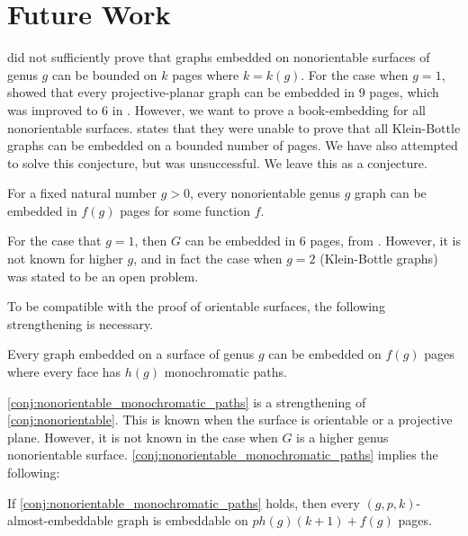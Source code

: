 
\section{Future Work}

\textcite{heathEmbeddingPlanarGraphs1984} did not sufficiently prove that graphs embedded on nonorientable surfaces of genus $g$ can be bounded on $k$ pages where $k = k(g)$. For the case when $g = 1$, \textcite{nakamotoBookEmbeddingProjectiveplanar2015} showed that every projective-planar graph can be embedded in $9$ pages, which was improved to 6 in \textcite{ozekiBookEmbeddingGraphs2019}. However, we want to prove a book-embedding for all nonorientable surfaces. 
\textcite{ozekiBookEmbeddingGraphs2019} states that they were unable to prove that all Klein-Bottle graphs can be embedded on a bounded number of pages. We have also attempted to solve this conjecture, but was unsuccessful. We leave this as a conjecture. 

\begin{conjecture}\label{conj:nonorientable}
	For a fixed natural number $g > 0$, every nonorientable genus $g$ graph can be embedded in $f(g)$ pages for some function $f$. 
\end{conjecture}

For the case that $g = 1$, then $G$ can be embedded in 6 pages, from \textcite{ozekiBookEmbeddingGraphs2019}. However, it is not known for higher $g$, and in fact the case when $g = 2$ (Klein-Bottle graphs) was stated to be an open problem. 

To be compatible with the proof of orientable surfaces, the following strengthening is necessary. 
\begin{conjecture}\label{conj:nonorientable_monochromatic_paths}
	Every graph embedded on a surface of genus $g$ can be embedded on $f(g)$ pages where every face has $h(g)$ monochromatic paths. 
\end{conjecture}

\cref{conj:nonorientable_monochromatic_paths} is a strengthening of \cref{conj:nonorientable}. This is known when the surface is orientable or a projective plane. However, it is not known in the case when $G$ is a higher genus nonorientable surface.
\cref{conj:nonorientable_monochromatic_paths} implies the following:

\begin{corollary}\label{corr:aegraphs}
	If \cref{conj:nonorientable_monochromatic_paths} holds, then every $(g, p, k)$-almost-embeddable graph is embeddable on $p h(g) (k + 1) + f(g)$ pages.
\end{corollary}

